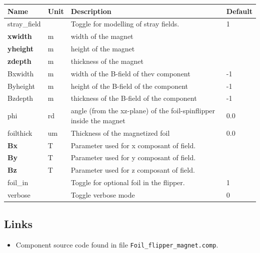 \begin{longtable}{p{}p{}p{}p{}}
\toprule
\textbf{Name} & \textbf{Unit} & \textbf{Description} & \textbf{Default} \\
\midrule
\endhead
stray\_field &   & Toggle for modelling of stray fields. & 1 \\
\textbf{xwidth} & m & width of the magnet &  \\
\textbf{yheight} & m & height of the magnet &  \\
\textbf{zdepth} & m & thickness of the magnet &  \\
Bxwidth & m & width of the B-field of thev component & -1 \\
Byheight & m & height of the B-field of the component & -1 \\
Bzdepth & m & thickness of the B-field of the component & -1 \\
phi & rd & angle (from the xz-plane) of the foil-spinflipper inside the magnet & 0.0 \\
foilthick & um & Thickness of the magnetized foil & 0.0 \\
\textbf{Bx} & T & Parameter used for x composant of field. &  \\
\textbf{By} & T & Parameter used for y composant of field. &  \\
\textbf{Bz} & T & Parameter used for z composant of field. &  \\
foil\_in &   & Toggle for optional foil in the flipper. & 1 \\
verbose &   & Toggle verbose mode & 0 \\
\bottomrule
\end{longtable}

\subsection*{Links}
\begin{itemize}
  \item Component source code found in file \texttt{Foil\_flipper\_magnet.comp}.
\end{itemize}
